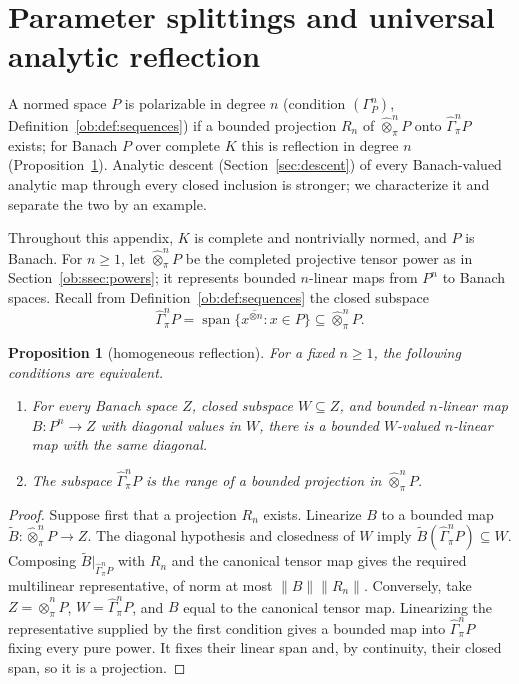\documentclass[11pt]{amsart}
\newtheorem{proposition}[theorem]{Proposition}
\theoremstyle{definition}
\theoremstyle{remark}
\numberwithin{equation}{section}
\newcommand{\spn}{\operatorname{span}}
\newcommand{\norm}[1]{\lVert #1\rVert}
\theoremstyle{plain}
\theoremstyle{definition}
\theoremstyle{plain}
\begin{document}
\section{Parameter splittings and universal analytic reflection}\label{app:reflection}\label{fam:sec:tensors}
A normed space $P$ is polarizable in degree $n$ (condition $(\Gamma^n_P)$, Definition~\ref{ob:def:sequences}) if a bounded
projection $R_n$ of $\widehat\otimes^n_\pi P$ onto $\widehat\Gamma^n_\pi P$ exists; for Banach $P$ over complete $K$ this is
reflection in degree $n$ (Proposition~\ref{fam:prop:tensor-homogeneous}). Analytic descent (Section~\ref{sec:descent}) of every
Banach-valued analytic map through every closed inclusion is stronger; we characterize it and separate the two by an example.

Throughout this appendix, $K$ is complete and nontrivially normed, and $P$ is Banach.
For $n\ge1$, let $\widehat\otimes^n_\pi P$ be the completed projective tensor power as in
Section~\ref{ob:ssec:powers}; it represents bounded $n$\nobreakdash-linear maps from $P^n$ to Banach spaces.
Recall from Definition~\ref{ob:def:sequences} the closed subspace
\[
 \widehat\Gamma^n_\pi P=\overline{\spn\{x^{\otimes n}:x\in P\}}\subseteq \widehat\otimes^n_\pi P.
\]

\begin{proposition}[homogeneous reflection]\label{fam:prop:tensor-homogeneous}
For a fixed $n\ge1$, the following conditions are equivalent.
\begin{enumerate}
\item For every Banach space $Z$, closed subspace $W\subseteq Z$, and bounded $n$\nobreakdash-linear map
$B\colon P^n\to Z$ with diagonal values in $W$, there is a bounded $W$\nobreakdash-valued
$n$\nobreakdash-linear map with the same diagonal.
\item The subspace $\widehat\Gamma^n_\pi P$ is the range of a bounded projection in $\widehat\otimes^n_\pi P$.
\end{enumerate}
\end{proposition}

\begin{proof}
Suppose first that a projection $R_n$ exists. Linearize $B$ to a bounded map
$\widetilde B\colon \widehat\otimes^n_\pi P\to Z$. The diagonal hypothesis and closedness of $W$ imply
$\widetilde B(\widehat\Gamma^n_\pi P)\subseteq W$.
Composing $\widetilde B|_{\widehat\Gamma^n_\pi P}$ with $R_n$ and the canonical tensor map gives the required
multilinear representative, of norm at most $\norm B\norm{R_n}$.
Conversely, take $Z=\widehat\otimes^n_\pi P$, $W=\widehat\Gamma^n_\pi P$, and $B$ equal to the canonical tensor map.
Linearizing the representative supplied by the first condition gives a bounded map into $\widehat\Gamma^n_\pi P$
fixing every pure power. It fixes their linear span and, by continuity, their closed span, so it is a projection.
\end{proof}
\end{document}
